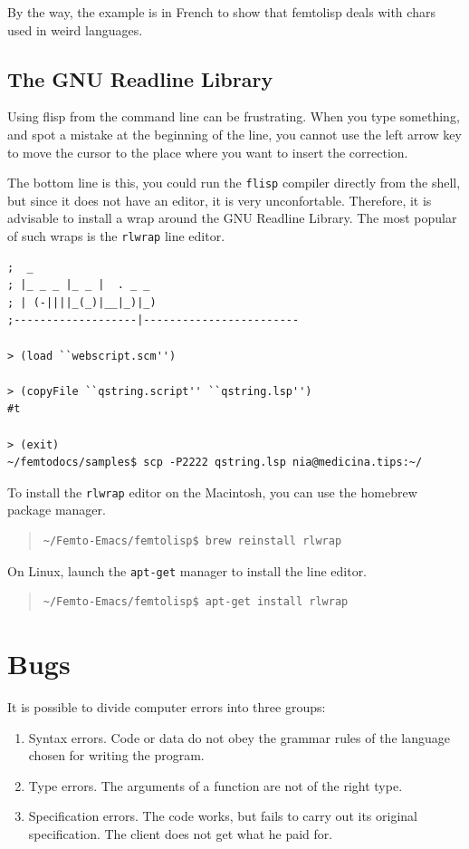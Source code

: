 \documentclass[a4paper,12pt]{book}
\begin{document}
By the way, the example is in French to show
that femtolisp deals with chars used in
weird languages.

\section{The GNU Readline Library}
Using flisp from the command line can be frustrating.
When you type something, and spot a mistake at the
beginning of the line, you cannot use the
\keys{$\leftarrow$} left arrow key to move
the cursor to the place where you want to
insert the correction. 


The bottom line is this, you could
run the \verb|flisp| compiler directly
from the shell, but since it does not
have an editor, it is very unconfortable.
Therefore, it is advisable to install
a wrap around the GNU Readline Library.
The most popular of such wraps
is the \verb|rlwrap| line editor.


\begin{Verbatim}[fontsize=\small,
frame=single,
framerule=0.5mm]
;  _
; |_ _ _ |_ _ |  . _ _
; | (-||||_(_)|__|_)|_)
;-------------------|------------------------

> (load ``webscript.scm'')

> (copyFile ``qstring.script'' ``qstring.lsp'')
#t

> (exit)
~/femtodocs/samples$ scp -P2222 qstring.lsp nia@medicina.tips:~/
\end{Verbatim}


To install the \verb|rlwrap| editor
on the Macintosh, you can use the
homebrew package manager.
\begin{quote}
\begin{verbatim}
~/Femto-Emacs/femtolisp$ brew reinstall rlwrap
\end{verbatim}
\end{quote}
On Linux, launch the \verb|apt-get|
manager to install the line editor.
\begin{quote}
\begin{verbatim}
~/Femto-Emacs/femtolisp$ apt-get install rlwrap
\end{verbatim}
\end{quote}


\chapter{Bugs}
It is possible to divide computer errors into three groups:
\begin{enumerate}
\item Syntax errors. Code or data
do not obey the grammar rules of the language
chosen for writing the program.
\item Type errors. The arguments of a function
are not of the right type.
\item Specification errors. The code works,
but fails to carry out its original specification.
The client does not get what he paid for.
\end{enumerate}
\end{document}
